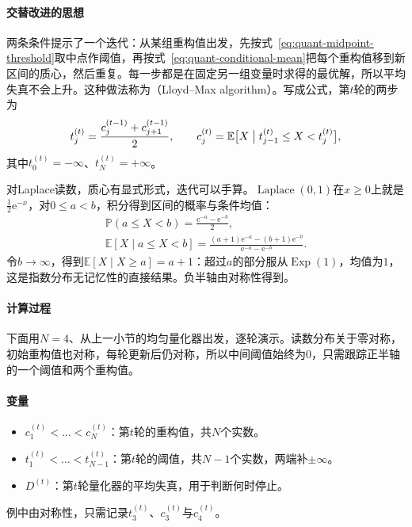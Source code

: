\paragraph{交替改进的思想}
两条条件提示了一个迭代：从某组重构值出发，先按式~\eqref{eq:quant-midpoint-threshold}取中点作阈值，再按式~\eqref{eq:quant-conditional-mean}把每个重构值移到新区间的质心，然后重复。每一步都是在固定另一组变量时求得的最优解，所以平均失真不会上升。这种做法称为（Lloyd--Max algorithm）。写成公式，第$t$轮的两步为
\begin{equation}
 t_j^{(t)}=\frac{c_j^{(t-1)}+c_{j+1}^{(t-1)}}{2},\qquad
 c_j^{(t)}=\mathbb{E}\bigl[X\bigm| t_{j-1}^{(t)}\leq X<t_j^{(t)}\bigr] ,
 \label{eq:quant-lloyd-update}
\end{equation}
其中$t_0^{(t)}=-\infty$、$t_N^{(t)}=+\infty$。

对Laplace读数，质心有显式形式，迭代可以手算。$\operatorname{Laplace}(0,1)$在$x\geq0$上就是$\frac12\mathrm{e}^{-x}$，对$0\leq a<b$，积分得到区间的概率与条件均值：
\begin{equation}
 \begin{gathered}
 \mathbb{P}(a\leq X<b)=\frac{\mathrm{e}^{-a}-\mathrm{e}^{-b}}{2},\\
 \mathbb{E}[X\mid a\leq X<b]=\frac{(a+1)\mathrm{e}^{-a}-(b+1)\mathrm{e}^{-b}}{\mathrm{e}^{-a}-\mathrm{e}^{-b}} .
 \end{gathered}
 \label{eq:quant-laplace-centroid}
\end{equation}
令$b\to\infty$，得到$\mathbb{E}[X\mid X\geq a]=a+1$：超过$a$的部分服从$\operatorname{Exp}(1)$，均值为$1$，这是指数分布无记忆性的直接结果。负半轴由对称性得到。

\paragraph{计算过程}
下面用$N=4$、从上一小节的均匀量化器出发，逐轮演示。读数分布关于零对称，初始重构值也对称，每轮更新后仍对称，所以中间阈值始终为$0$，只需跟踪正半轴的一个阈值和两个重构值。

\paragraph{变量}
\begin{itemize}
 \item $c_1^{(t)}<\dots<c_N^{(t)}$：第$t$轮的重构值，共$N$个实数。
 \item $t_1^{(t)}<\dots<t_{N-1}^{(t)}$：第$t$轮的阈值，共$N-1$个实数，两端补$\pm\infty$。
 \item $D^{(t)}$：第$t$轮量化器的平均失真，用于判断何时停止。
\end{itemize}
例中由对称性，只需记录$t_3^{(t)}$、$c_3^{(t)}$与$c_4^{(t)}$。

